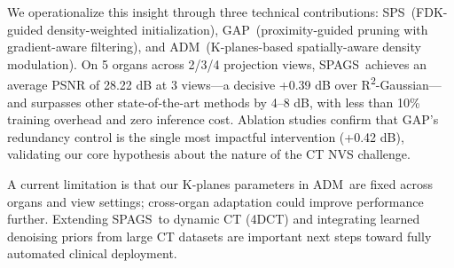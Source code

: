 \documentclass{egPublStyle}
\newcommand{\spags}{SPAGS}
\newcommand{\sps}{SPS}
\newcommand{\gap}{GAP}
\newcommand{\adm}{ADM}
\newcommand{\rtwo}{R\textsuperscript{2}-Gaussian}
\begin{document}
We operationalize this insight through three technical contributions: \sps\ (FDK-guided density-weighted initialization), \gap\ (proximity-guided pruning with gradient-aware filtering), and \adm\ (K-planes-based spatially-aware density modulation). On 5 organs across 2/3/4 projection views, \spags\ achieves an average PSNR of 28.22 dB at 3 views---a decisive +0.39 dB over \rtwo---and surpasses other state-of-the-art methods by 4--8 dB, with less than 10\% training overhead and zero inference cost. Ablation studies confirm that \gap's redundancy control is the single most impactful intervention (+0.42 dB), validating our core hypothesis about the nature of the CT NVS challenge.

A current limitation is that our K-planes parameters in \adm\ are fixed across organs and view settings; cross-organ adaptation could improve performance further. Extending \spags\ to dynamic CT (4DCT) and integrating learned denoising priors from large CT datasets are important next steps toward fully automated clinical deployment.

\balance

\end{document}
